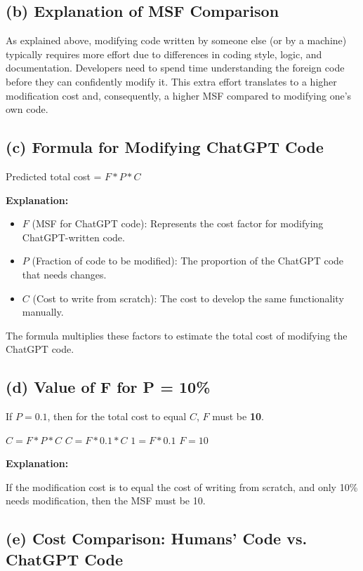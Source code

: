 \documentclass{article}
\begin{document}
\subsection*{(b) Explanation of MSF Comparison}

As explained above, modifying code written by someone else (or by a machine) typically requires more effort due to differences in coding style, logic, and documentation. Developers need to spend time understanding the foreign code before they can confidently modify it. This extra effort translates to a higher modification cost and, consequently, a higher MSF compared to modifying one's own code.

\subsection*{(c) Formula for Modifying ChatGPT Code}

Predicted total cost =  $F * P * C$

\textbf{Explanation:}

\begin{itemize}
    \item $F$ (MSF for ChatGPT code): Represents the cost factor for modifying ChatGPT-written code.
    \item $P$ (Fraction of code to be modified): The proportion of the ChatGPT code that needs changes.
    \item $C$ (Cost to write from scratch): The cost to develop the same functionality manually.
\end{itemize}
The formula multiplies these factors to estimate the total cost of modifying the ChatGPT code.

\subsection*{(d) Value of F for P = 10\%}

If $P = 0.1$, then for the total cost to equal $C$, $F$ must be \textbf{10}.

$C = F * P * C$
$C = F * 0.1 * C$
$1 = F * 0.1$
$F = 10$

\textbf{Explanation:}

If the modification cost is to equal the cost of writing from scratch, and only 10\% needs modification, then the MSF must be 10.

\subsection*{(e) Cost Comparison: Humans' Code vs. ChatGPT Code}
\end{document}

